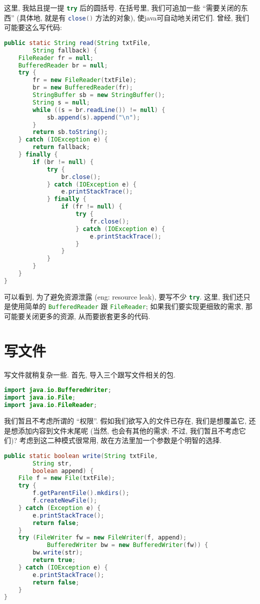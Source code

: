 这里, 我姑且提一提 \lstinline[language=Java]`try` 后的圆括号.
在括号里, 我们可追加一些 ``需要关闭的东西''
(具体地, 就是有 \lstinline[language=Java]`close()` 方法的对象),
使\gls{java}可自动地关闭它们.
曾经, 我们可能要这么写代码:
\begin{lstlisting}[frame=single,language=Java]
public static String read(String txtFile,
        String fallback) {
    FileReader fr = null;
    BufferedReader br = null;
    try {
        fr = new FileReader(txtFile);
        br = new BufferedReader(fr);
        StringBuffer sb = new StringBuffer();
        String s = null;
        while ((s = br.readLine()) != null) {
            sb.append(s).append("\n");
        }
        return sb.toString();
    } catch (IOException e) {
        return fallback;
    } finally {
        if (br != null) {
            try {
                br.close();
            } catch (IOException e) {
                e.printStackTrace();
            } finally {
                if (fr != null) {
                    try {
                        fr.close();
                    } catch (IOException e) {
                        e.printStackTrace();
                    }
                }
            }
        }
    }
}
\end{lstlisting}

可以看到, 为了避免资源泄露 (\gls{eng}: resource leak),
要写不少 \lstinline[language=Java]`try`.
这里, 我们还只是使用简单的
\lstinline[language=Java]`BufferedReader`
跟
\lstinline[language=Java]`FileReader`;
如果我们要实现更细致的需求,
那可能要关闭更多的资源,
从而要嵌套更多的代码.

\section{写文件}

写文件就稍复杂一些.
首先, 导入三个跟写文件相关的包.
\begin{lstlisting}[language=Java]
import java.io.BufferedWriter;
import java.io.File;
import java.io.FileReader;
\end{lstlisting}

我们暂且不考虑所谓的 ``权限''.
假如我们欲写入的文件已存在,
我们是想覆盖它,
还是想添加内容到文件末尾呢
(当然, 也会有其他的需求;
不过, 我们暂且不考虑它们)?
考虑到这二种模式很常用,
故在方法里加一个参数是个明智的选择.

\begin{lstlisting}[frame=single,language=Java]
public static boolean write(String txtFile,
        String str,
        boolean append) {
    File f = new File(txtFile);
    try {
        f.getParentFile().mkdirs();
        f.createNewFile();
    } catch (Exception e) {
        e.printStackTrace();
        return false;
    }
    try (FileWriter fw = new FileWriter(f, append);
            BufferedWriter bw = new BufferedWriter(fw)) {
        bw.write(str);
        return true;
    } catch (IOException e) {
        e.printStackTrace();
        return false;
    }
}
\end{lstlisting}

